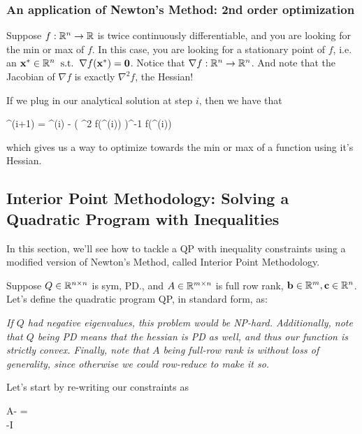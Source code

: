 \subsubsection{An application of Newton's Method: 2nd order optimization}

Suppose $f: \mathbb{R}^n \rightarrow \mathbb{R}$ is twice continuously differentiable, 
and you are looking for the min or max of $f$. 
In this case, you are looking for a stationary point
of $f$, i.e. an $\mathbf{x}^* \in \mathbb{R}^n \;\; \text{s.t.} \;\; \nabla f(\mathbf{x}^*) = \mathbf{0}$.
Notice that $\nabla f: \mathbb{R}^n \rightarrow \mathbb{R}^n$. And note that the Jacobian
of $\nabla f$ is exactly $\nabla^2 f$, the Hessian!

If we plug in our analytical solution at step $i$, then we have that
\begin{frml}
	\vx^{(i+1)} = \vx^{(i)} - \big( \nabla^2 f(\vx^{(i)}) \big)^{-1} \nabla f(\vx^{(i)})
\end{frml}
which gives us a way to optimize towards the min or max of a function using it's
Hessian.

\subsection{Interior Point Methodology: Solving a Quadratic Program with Inequalities}

In this section, we'll see how to tackle a QP with inequality
constraints using a modified version of Newton's Method, called
Interior Point Methodology.

Suppose $Q \in \mathbb{R}^{n \times n}$ is sym, PD., and $A \in \mathbb{R}^{m \times n}$
is full row rank, $\mathbf{b} \in \mathbb{R}^m, \mathbf{c} \in \mathbb{R}^n$. Let's define the
quadratic program QP, in standard form, as:


\textit{If $Q$ had negative eigenvalues, this problem would be NP-hard. 
Additionally, note that $Q$ being PD means that the hessian is PD as well, and
thus our function is strictly convex. Finally, note that $A$ being full-row rank
is without loss of generality, since otherwise we could row-reduce to make it so.}

Let's start by re-writing our constraints as
\begin{frml}
	A\vx - \vb = \vzero \\
	-I\vx \leq \vzero
\end{frml}

